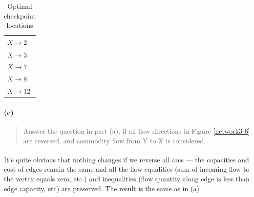 \begin{table}[H]
\centering
\begin{tabular}{|l|}
\hline
$X \rightarrow 2$ \\ \hline
$X \rightarrow 3$ \\ \hline
$X \rightarrow 7$ \\ \hline
$X \rightarrow 8$ \\ \hline
$X \rightarrow 12$ \\ \hline
\end{tabular}
\caption{Optimal checkpoint locations}
\label{mincut3-6b}
\end{table}

\paragraph{(c)}
\begin{quote}
Answer the question in part (a), if all flow directions in Figure \ref{network3-6} are reversed, and commodity flow from Y to X is considered.
\end{quote}

\paragraph{}
It's quite obvious that nothing changes if we reverse all arcs --- the capacities and cost of edges remain the same and all the flow equalities (sum of incoming flow to the vertex equals zero, etc.) and inequalities (flow quantity along edge is less than edge capacity, etc) are preserved. The result is the same as in (a).

